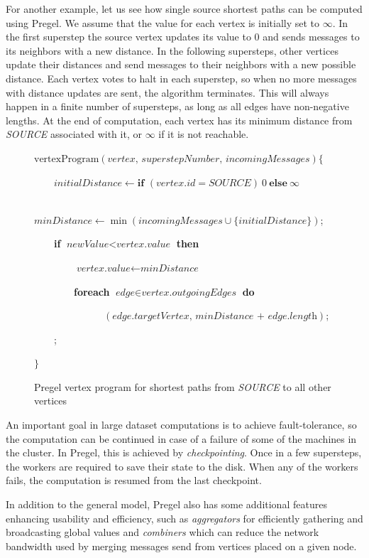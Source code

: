 \documentclass{pracamgr}
\theoremstyle{plain}
\theoremstyle{definition}
\theoremstyle{remark}
\begin{document}
For another example, let us see how single source shortest paths can be computed using Pregel. 
We assume that the value for each vertex is initially set to $\infty$.
In the first superstep the source vertex updates its value to $0$ and sends messages to its neighbors with a new distance. In the following supersteps,
other vertices update their distances and send messages to their neighbors with a new possible distance. Each vertex votes to halt in each superstep, so when no more messages with distance updates are sent, the algorithm terminates. This will always happen in a finite number of supersteps, as long as all edges have non-negative lengths. At the end of computation, each vertex has its minimum distance from \textit{SOURCE} associated with it, or $\infty$ if it is not reachable.

\begin{figure}[h!]
\parbox{0.8\textwidth}{
$\text{vertexProgram}(\textit{vertex, superstepNumber, incomingMessages}) \{$

~~~~$\textit{initialDistance} \leftarrow \textbf{if }(vertex.id = SOURCE)~0~\textbf{else}~\infty$

~~~~$\textit{minDistance} \leftarrow \min(\textit{incomingMessages} \cup \{\textit{initialDistance}\})$;

~~~~\textbf{if} $\textit{newValue} < \textit{vertex.value}$ \textbf{then}

~~~~~~~~$\textit{vertex.value} \leftarrow \textit{minDistance}$

~~~~~~~~\textbf{foreach} $\textit{edge} \in \textit{vertex.outgoingEdges}$ \textbf{do}

~~~~~~~~~~~~~~$(\textit{edge.targetVertex, minDistance + edge.length})$;

~~~~;

$\}$
}

\caption{Pregel vertex program for shortest paths from \textit{SOURCE} to all other vertices}
\end{figure}


An important goal in large dataset computations is to achieve fault-tolerance, so the computation can be continued in case of a failure of some of the machines in the cluster. In Pregel, this is achieved by \emph{checkpointing}. Once in a few supersteps, the workers are required to save their state to the disk. When any of the workers fails, the computation is resumed from the last checkpoint.

In addition to the general model, Pregel also has some additional features enhancing usability and efficiency, such as \emph{aggregators} for efficiently gathering and broadcasting global values and \emph{combiners} which can reduce the network bandwidth used by merging messages send from vertices placed on a given node.
\end{document}

